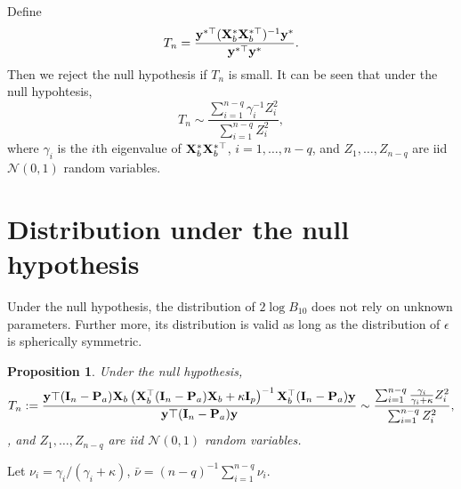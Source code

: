 \documentclass[11pt]{article}
\newcommand{\By}{\mathbf{y}}    \newcommand{\Bz}{\mathbf{z}}
\theoremstyle{plain}
\newtheorem{proposition}{\quad\quad Proposition}
\theoremstyle{definition}
\theoremstyle{remark}
\begin{document}
Define
\begin{equation*}
    T_n= \frac{\By^{*\top} ( \BX_b^* \BX_b^{*\top} )^{-1} \By^* }{\By^{*\top} \By^*} .
\end{equation*}
Then we reject the null hypothesis if $T_n$ is small.
It can be seen that under the null hypohtesis,
\begin{equation*}
    T_n \sim
    \frac{\sum_{i=1}^{n-q} \gamma_i^{-1} Z_i^2}{\sum_{i=1}^{n-q} Z_i^2},
    \end{equation*}
    where $\gamma_i$ is the $i$th eigenvalue of $  \mathbf{X}_b^* \mathbf{X}_b^{*\top}$, $i=1,\ldots, n-q$, and $Z_1,\ldots, Z_{n-q}$ are iid $\mathcal N(0,1)$ random variables.


\section{Distribution under the null hypothesis}
Under the null hypothesis, the distribution of $2\log B_{10}$ does not rely on unknown parameters.
Further more, its distribution is valid as long as the distribution of $\epsilon$ is spherically symmetric.
\begin{proposition}
    Under the null hypothesis,
    \begin{equation*}
        T_n:=\frac{
            \By\top (\BI_n-\BP_a) \BX_b
            \left(\BX_b^\top  (\BI_n-\BP_a) \BX_b + \kappa \BI_p\right)^{-1}
            \BX_b^\top (\BI_n-\BP_a) \By
        }{
            \By\top (\BI_n-\BP_a) \By
        }
        \sim
        \frac{\sum_{i=1}^{n-q} \frac{\gamma_i}{\gamma_i +\kappa}Z_i^2}{\sum_{i=1}^{n-q} Z_i^2},
    \end{equation*}
    , and $Z_1,\ldots, Z_{n-q}$ are iid $\mathcal N(0,1)$ random variables.
\end{proposition}
Let $\nu_i={\gamma_i}/(\gamma_i +\kappa)$, $\bar \nu = (n-q)^{-1} \sum_{i=1}^{n-q} \nu_i$.
\end{document}
